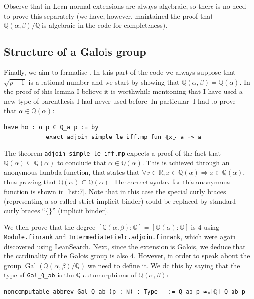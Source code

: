 \documentclass[a4paper,11pt]{article}
\theoremstyle{plain}
\newcommand{\R}{\ensuremath{\mathbb{R}}} %
\newcommand{\Q}{\ensuremath{\mathbb{Q}}} %
\DeclareMathOperator{\Gal}{Gal} %
\begin{document}
	Observe that in Lean normal extensions are always algebraic, so there is no need to prove this separately (we have, however, maintained the proof that $\Q(\alpha,\beta)/\Q$ is algebraic in the code for completeness). 
	
	\subsection{Structure of a Galois group}
	
	Finally, we aim to formalise . In this part of the code we always suppose that $\sqrt{p-1}$ is a rational number and we start by showing that $\Q(\alpha,\beta)=\Q(\alpha)$. In the proof of this lemma I believe it is worthwhile mentioning that I have used a new type of parenthesis I had never used before. In particular, I had to prove that $\alpha\in\Q(\alpha)$:\\
	
	\begin{lstlisting}[caption={Proving that $\alpha\in\Q(\alpha)$.}, label={list:7}]
		have hα : α p ∈ Q_a p := by
			exact adjoin_simple_le_iff.mp fun ⦃x⦄ a => a
	\end{lstlisting}
	
	The theorem \lstinline|adjoin_simple_le_iff.mp| expects a proof of the fact that $\Q(\alpha)\subseteq \Q(\alpha)$ to conclude that $\alpha\in \Q(\alpha)$. This is achieved through an anonymous lambda function, that states that $\forall x\in\R, x\in\Q(\alpha)\Rightarrow x\in\Q(\alpha)$, thus proving that $\Q(\alpha)\subseteq \Q(\alpha)$. The correct syntax for this anonymous function is shown in \cref{list:7}. Note that in this case the special curly braces (representing a so-called strict implicit binder) could be replaced by standard curly braces ``$\{\}$'' (implicit binder).
	
	We then prove that the degree $[\Q(\alpha,\beta):\Q]=[\Q(\alpha):\Q]$ is $4$ using \lstinline|Module.finrank| and \lstinline|IntermediateField.adjoin.finrank|, which were again discovered using LeanSearch. Next, since the extension is Galois, we deduce that the cardinality of the Galois group is also $4$. However, in order to speak about the group $\Gal(\Q(\alpha,\beta)/\Q)$ we need to define it. We do this by saying that the type of \lstinline|Gal_Q_ab| is the $\Q$-automorphisms of $\Q(\alpha,\beta)$:\\
	
	\begin{lstlisting}[caption={Defining the Galois group of $\Q(\alpha,\beta)$.}, label={list:6}]
		noncomputable abbrev Gal_Q_ab (p : ℕ) : Type _ := Q_ab p ≃ₐ[ℚ] Q_ab p
	\end{lstlisting}
\end{document}
